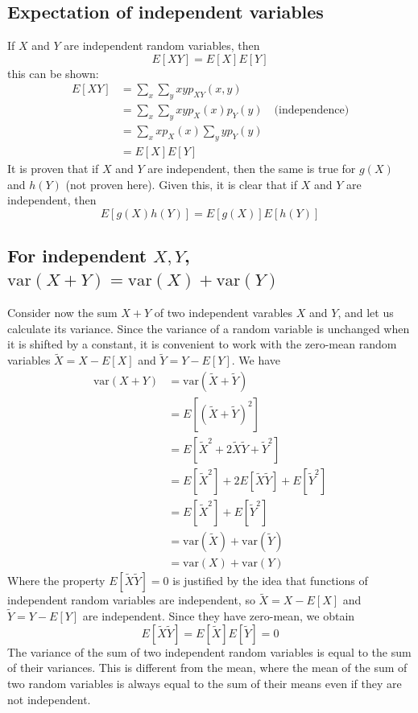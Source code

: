 \documentclass{report}
\begin{document}
\subsection{Expectation of independent variables}
If $X$ and $Y$ are independent random variables, then
\begin{equation*}
E[XY]=E[X]E[Y]
\end{equation*}
this can be shown:
\begin{align*}
E[XY]&=\sum_x\sum_yxyp_{XY}(x,y)\\
&=\sum_x\sum_yxyp_{X}(x)p_{Y}(y)\quad\text{(independence)}\\
&=\sum_xxp_X(x)\sum_yyp_Y(y)\\
&=E[X]E[Y]
\end{align*}
It is proven that if $X$ and $Y$ are independent, then the same is true for $g(X)$ and $h(Y)$ (not proven here). Given this, it is clear that if $X$ and $Y$ are independent, then
\begin{equation*}
E[g(X)h(Y)]=E[g(X)]E[h(Y)]
\end{equation*}

\subsection{For independent $X,Y$, $\text{var}(X+Y)=\text{var}(X)+\text{var}(Y)$}
Consider now the sum $X+Y$ of two independent varables $X$ and $Y$, and let us calculate its variance. Since the variance of a random variable is unchanged when it is shifted by a constant, it is
convenient to work with the zero-mean random variables
$\tilde X=X-E[X]$ and $\tilde Y=Y-E[Y]$. We have
\begin{align*}
\text{var}(X+Y)&=\text{var}(\tilde X+\tilde Y)\\
&=E[(\tilde X+\tilde Y)^2]\\
&=E[\tilde X^2+2\tilde X\tilde Y+\tilde Y^2]\\
&=E[\tilde X^2]+2E[\tilde X\tilde Y]+E[\tilde Y^2]\\
&=E[\tilde X^2]+E[\tilde Y^2]\\
&=\text{var}(\tilde X)+\text{var}(\tilde Y)\\
&=\text{var}(X)+\text{var}(Y)
\end{align*}
Where the property $E[\tilde X\tilde Y]=0$ is justified by the idea that functions of independent random variables are independent, so $\tilde X=X-E[X]$ and $\tilde Y=Y-E[Y]$ are independent. 
Since they have zero-mean, we obtain
\begin{equation*}
E[\tilde X\tilde Y]=E[\tilde X]E[\tilde Y]=0
\end{equation*}
The variance of the sum of two independent random variables is equal to the sum of their variances. This is different from the mean, where the mean of the sum of two random variables is always equal
to the sum of their means even if they are not independent.
\newpage
\end{document}
